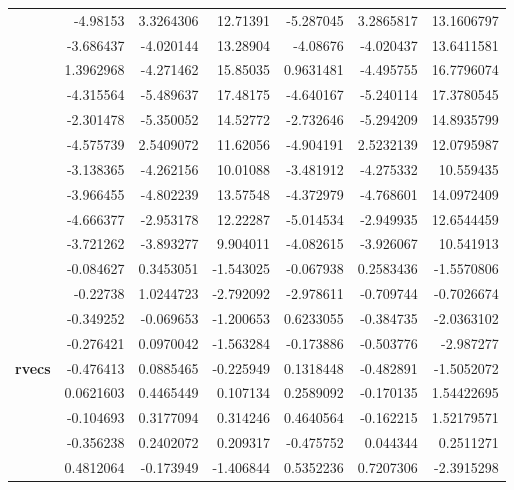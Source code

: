 \documentclass[UTF8]{ctexart}
\begin{document}
\begin{appendices}
\begin{table}[htbp]
\begin{tabular}{|c|r|r|r|r|r|r|}
\cmidrule{2-7}          & -4.98153 & 3.3264306 & 12.71391 & -5.287045 & 3.2865817 & 13.1606797 \\
\cmidrule{2-7}          & -3.686437 & -4.020144 & 13.28904 & -4.08676 & -4.020437 & 13.6411581 \\
\cmidrule{2-7}          & 1.3962968 & -4.271462 & 15.85035 & 0.9631481 & -4.495755 & 16.7796074 \\
\cmidrule{2-7}          & -4.315564 & -5.489637 & 17.48175 & -4.640167 & -5.240114 & 17.3780545 \\
\cmidrule{2-7}          & -2.301478 & -5.350052 & 14.52772 & -2.732646 & -5.294209 & 14.8935799 \\
\cmidrule{2-7}          & -4.575739 & 2.5409072 & 11.62056 & -4.904191 & 2.5232139 & 12.0795987 \\
\cmidrule{2-7}          & -3.138365 & -4.262156 & 10.01088 & -3.481912 & -4.275332 & 10.559435 \\
\cmidrule{2-7}          & -3.966455 & -4.802239 & 13.57548 & -4.372979 & -4.768601 & 14.0972409 \\
\cmidrule{2-7}          & -4.666377 & -2.953178 & 12.22287 & -5.014534 & -2.949935 & 12.6544459 \\
\cmidrule{2-7}          & -3.721262 & -3.893277 & 9.904011 & -4.082615 & -3.926067 & 10.541913 \\
\bottomrule[1pt]
    \toprule[1pt]
    \multirow{13}[26]{*}{\textbf{rvecs}} & -0.084627 & 0.3453051 & -1.543025 & -0.067938 & 0.2583436 & -1.5570806 \\
\cmidrule{2-7}          & -0.22738 & 1.0244723 & -2.792092 & -2.978611 & -0.709744 & -0.7026674 \\
\cmidrule{2-7}          & -0.349252 & -0.069653 & -1.200653 & 0.6233055 & -0.384735 & -2.0363102 \\
\cmidrule{2-7}          & -0.276421 & 0.0970042 & -1.563284 & -0.173886 & -0.503776 & -2.987277 \\
\cmidrule{2-7}          & -0.476413 & 0.0885465 & -0.225949 & 0.1318448 & -0.482891 & -1.5052072 \\
\cmidrule{2-7}          & 0.0621603 & 0.4465449 & 0.107134 & 0.2589092 & -0.170135 & 1.54422695 \\
\cmidrule{2-7}          & -0.104693 & 0.3177094 & 0.314246 & 0.4640564 & -0.162215 & 1.52179571 \\
\cmidrule{2-7}          & -0.356238 & 0.2402072 & 0.209317 & -0.475752 & 0.044344 & 0.2511271 \\
\cmidrule{2-7}          & 0.4812064 & -0.173949 & -1.406844 & 0.5352236 & 0.7207306 & -2.3915298 \\

\end{tabular}
\end{table}
\end{appendices}
\end{document}
